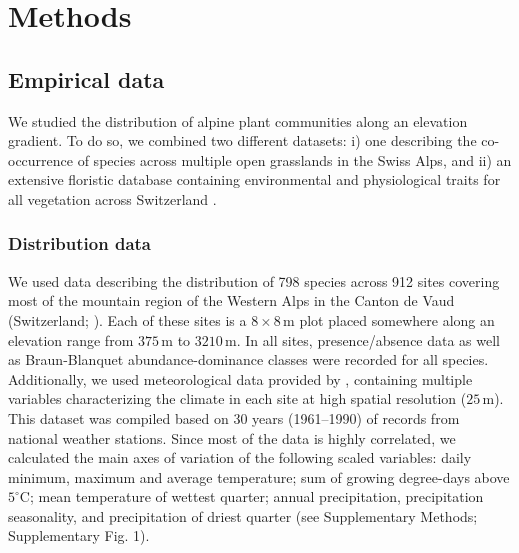 \documentclass[11pt, a4paper]{article}
\begin{document}


 
\section*{Methods}
\subsection*{Empirical data}
We studied the distribution of alpine plant communities along an elevation gradient. To do so, we combined two different datasets: i) one describing the co-occurrence of species across multiple open grasslands in the Swiss Alps, and ii) an extensive floristic database containing environmental and physiological traits for all vegetation across Switzerland \citep{landoltFloraIndicativaOkologische2010}. 

\subsubsection*{Distribution data}
We used data describing the distribution of 798 species across 912 sites covering most of the mountain region of the Western Alps in the Canton de Vaud (Switzerland; \citealt{scherrerEcologicalIndicatorValues2019}). Each of these sites is a $8\times 8\,\text{m}$ plot placed somewhere along an elevation range from $375\,\text{m}$ to $3210\,\text{m}$. In all sites, presence/absence data as well as Braun-Blanquet abundance-dominance classes were recorded for all species. Additionally, we used meteorological data provided by \citet{scherrerEcologicalIndicatorValues2019}, containing multiple variables characterizing the climate in each site at high spatial resolution ($25\,\text{m}$). This dataset was compiled based on 30 years (1961–1990) of records from national weather stations. Since most of the data is highly correlated, we calculated the main axes of variation of the following scaled variables: daily minimum, maximum and average temperature; sum of growing degree-days above $5^{\circ}\text{C}$; mean temperature of wettest quarter; annual precipitation, precipitation seasonality, and precipitation of driest quarter (see Supplementary Methods; Supplementary Fig. 1). %
\end{document}
